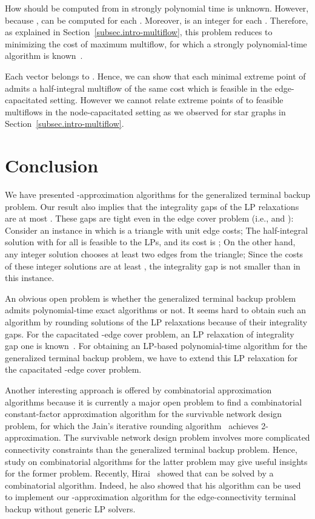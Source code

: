\documentclass{article}
\begin{document}
How  should be computed from  in strongly polynomial time is unknown.
However, because , 
 can be computed for each .
Moreover,  is an integer for each .
Therefore, as explained in Section~\ref{subsec.intro-multiflow}, this problem reduces to 
minimizing the cost of maximum multiflow,
for which a strongly polynomial-time algorithm is known~\cite{Karzanov94}.
\qquad\endproof

Each vector  belongs to . Hence,
we can show that each minimal extreme point of 
admits a half-integral multiflow of the same cost which is feasible in the edge-capacitated setting.
However we cannot relate extreme points of  to feasible multiflows 
in the node-capacitated setting as we observed for star graphs in Section~\ref{subsec.intro-multiflow}.



\section{Conclusion}
\label{sec.conclusion}

We have presented -approximation algorithms for the generalized terminal backup problem.
Our result also implies that the integrality gaps of 
the LP relaxations are at most .
These gaps are tight even in 
the edge cover problem (i.e.,  and ): 
Consider an instance in which  is a triangle with unit edge costs;
The half-integral solution  with
 for all  is feasible to the LPs, and its cost is ;
On the other hand, any integer solution chooses at least two edges from the triangle; 
Since the costs of these integer solutions are at least , the integrality gap is not smaller than  in this instance.


An obvious open problem is whether the generalized terminal
backup problem admits polynomial-time exact algorithms or not. 
It seems hard to obtain such an algorithm by rounding
solutions of the LP relaxations because of their integrality gaps.
For the capacitated -edge cover problem,
an LP relaxation of integrality gap one is known~\cite{schrijver-book}. 
For obtaining an LP-based polynomial-time algorithm for the generalized terminal backup problem,
we have to
extend this LP relaxation for the capacitated -edge cover problem.

Another interesting approach is offered by combinatorial 
approximation algorithms
because it is currently a major open problem to find 
a combinatorial constant-factor approximation
algorithm for the survivable network design problem,
for which 
the Jain's iterative rounding algorithm~\cite{Jain01}
achieves 2-approximation.
The survivable network design problem involves
more complicated connectivity constraints than the generalized terminal backup problem.
Hence, study on combinatorial algorithms for the 
latter problem may give useful insights for the 
former problem.
Recently, Hirai~\cite{Hirai14L-extendable} showed that  can
be solved by a combinatorial algorithm. Indeed, he also showed that
his algorithm can be used to implement our -approximation algorithm for the edge-connectivity
terminal backup without generic LP solvers.
\end{document}
